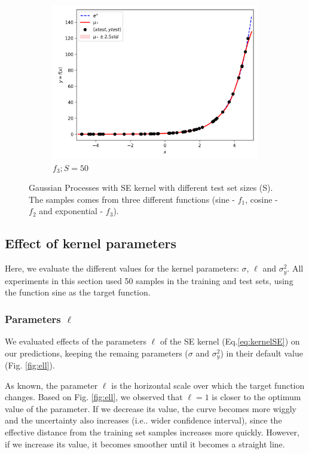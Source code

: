 \documentclass{article}
\makeatletter
\DeclareRobustCommand\onedot{\futurelet\@let@token\@onedot}
\def\@onedot{\ifx\@let@token.\else.\null\fi\xspace}
\def\ie{i.e\onedot} \def\Ie{I.e\onedot}
\makeatother
\begin{document}
\begin{figure}
\begin{subfigure}{.33\textwidth}
    \includegraphics[width=\linewidth]{test_size/func3_50.png}
    \caption{$f_3; S = 50$}
  \end{subfigure}
  \caption{Gaussian Processes with SE kernel with different test set sizes (S). The samples comes from three different functions (sine - $f_1$, cosine - $f_2$ and exponential - $f_3$).}
  \label{fig:test_samples}
  \end{figure}

\subsection{Effect of kernel parameters}

Here, we evaluate the different values for the kernel parameters: $\sigma$, $\ell$ and $\sigma_y^2$. All experiments in this section used 50 samples in the training and test sets, using the function sine as the target function.

\subsubsection{Parameters $\ell$}

We evaluated effects of the parameters $\ell$ of the SE kernel (Eq.\eqref{eq:kernelSE}) on our predictions, keeping the remaing parameters ($\sigma$ and $\sigma_y^2$) in their default value (Fig. \ref{fig:ell}).

As known, the parameter $\ell$ is the horizontal scale over which the target function changes. Based on Fig. \ref{fig:ell}, we observed that $\ell = 1$ is closer to the optimum value of the parameter. If we decrease its value, the curve becomes more wiggly and the uncertainty also increases (\ie wider confidence interval), since the effective distance from the training set samples increases more quickly. However, if we increase its value, it becomes smoother until it becomes a straight line. 
\end{document}
